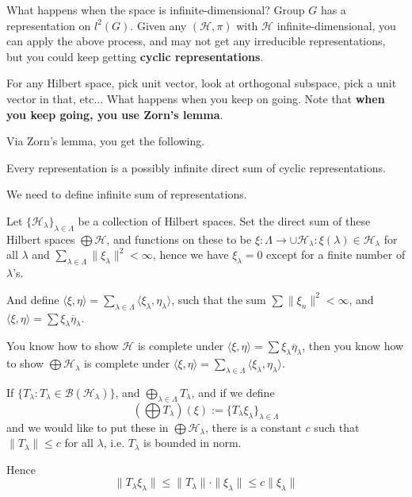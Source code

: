 What happens when the space is infinite-dimensional? Group $G$ has a representation on $l^2(G)$. Given any $(\mathcal{H}, \pi)$ with $\mathcal{H}$ infinite-dimensional, you can apply the above process, and may not get any irreducible representations, but you could keep getting \textbf{cyclic representations}.

For any Hilbert space, pick unit vector, look at orthogonal subspace, pick a unit vector in that, etc... What happens when you keep on going. Note that \textbf{ when you keep going, you use Zorn's lemma}.

Via Zorn's lemma, you get the following.
\begin{proposition}
    Every representation is a possibly infinite direct sum of cyclic representations.
\end{proposition} 
We need to define infinite sum of representations.

Let $\{\mathcal{H}_\lambda\}_{\lambda\in\Lambda}$ be a collection of Hilbert spaces. Set the direct sum of these Hilbert spaces $\bigoplus\mathcal{H}$, and functions on these to be $\xi:\Lambda\to \cup \mathcal{H}_\lambda: \xi(\lambda)\in\mathcal{H}_\lambda$ for all $\lambda$ and $\sum_{\lambda\in\Lambda}\|\xi_\lambda\|^2<\infty$, hence we have $\xi_\lambda=0$ except for a finite number of $\lambda$'s.

And define $\langle \xi, \eta\rangle=\sum_{\lambda\in\Lambda}\langle \xi_\lambda, \eta_\lambda\rangle$, such that the sum $\sum\|\xi_n\|^2<\infty$, and $\langle \xi, \eta\rangle=\sum\xi_\lambda\overline{\eta}_\lambda$.

You know how to show $\mathcal{H}$ is complete under $\langle \xi, \eta\rangle=\sum\xi_\lambda\overline{\eta}_\lambda$, then you know how to show $\bigoplus\mathcal{H}_\lambda$ is complete under $\langle \xi, \eta\rangle=\sum_{\lambda\in\Lambda}\langle \xi_\lambda, \eta_\lambda\rangle$.

If $\{T_\lambda: T_\lambda\in\mathcal{B}(\mathcal{H}_\lambda)\}$, and $\bigoplus_{\lambda\in\Lambda}T_\lambda$, and if we define
\begin{equation*}
    (\bigoplus T_\lambda)(\xi):=\{T_\lambda\xi_\lambda\}_{\lambda\in\Lambda}
\end{equation*}
and we would like to put these in $\bigoplus\mathcal{H}_\lambda$, there is a constant $c$ such that $\|T_\lambda\|\leq c$ for all $\lambda$, i.e. ${T_\lambda}$ is bounded in norm.

Hence
\begin{equation*}
    \|T_\lambda\xi_\lambda\|\leq\|T_\lambda\|\cdot\|\xi_\lambda\|\leq c\|\xi_\lambda\|
\end{equation*}

